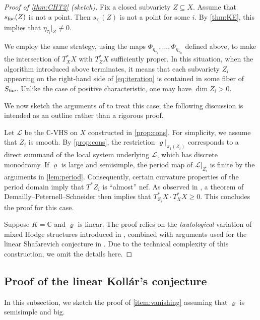 \documentclass[english]{amsproc}
\theoremstyle{plain}
\theoremstyle{definition}
\theoremstyle{remark}
\theoremstyle{plain}
\numberwithin{equation}{thm} %
\begin{document}
\begin{proof}[Proof of \cref{thm:CHT2} (sketch)]
		 
	Fix a closed subvariety $Z \subseteq X$. Assume that $s_{\rm fac}(Z)$ is not a point. Then $s_{\tau_i}(Z)$ is not a point for some $i$. By \cref{thm:KE}, this implies that $\eta_{\tau_i}|_{Z} \not\equiv 0$.
	
	We employ the same strategy, using the maps $\Phi_{\eta_{\tau_1}}, \ldots, \Phi_{\eta_{\tau_m}}$ defined above, to make the intersection of $T_X^*X$ with $T_Z^*X$ sufficiently proper. 
	In this situation, when the algorithm introduced above terminates, it means that each subvariety $Z_i$ appearing on the right-hand side of \eqref{eq:iteration} is contained in some fiber of $S_{\rm fac}$. 
	Unlike the case of positive characteristic, one may have $\dim Z_i > 0$.
	
	We now sketch the arguments of \cite{DW24} to treat this case; the following discussion is intended as an outline rather than a rigorous proof.
	
		
	Let $\mathcal{L}$ be the $\mathbb{C}$-VHS on $X$ constructed in \cref{prop:cons}. For simplicity, we assume that $Z_i$ is smooth. By \cref{prop:cons}, the restriction $\varrho|_{\pi_1(Z_i)}$ corresponds to a direct summand of the local system underlying $\mathcal{L}$, which has discrete monodromy. If $\varrho$ is large and semisimple, the period map of $\mathcal{L}|_{Z_i}$ is finite by the arguments in \cref{lem:period}. Consequently, certain curvature properties of the period domain imply that $T^*{Z_i}$ is ``almost'' nef. As observed in \cite{AW25}, a theorem of Demailly--Peternell--Schneider \cite{DPS94} then implies that $T_{Z_i}^*X \cdot T_X^*X \geq 0$. This concludes the proof for this case.
		
		\medspace
		
		  Suppose $K=\mathbb{C}$ and $\varrho$ is linear. The proof relies on the \emph{tautological} variation of mixed Hodge structures introduced in \cite{ES11}, combined with arguments used for the linear Shafarevich conjecture in \cite{EKPR12}. Due to the technical complexity of this construction, we omit the details here.
	\end{proof}	 
	\subsection{Proof of the linear Koll\'ar's conjecture}
	In this subsection, we sketch the proof of \cref{item:vanishing}  assuming that $\varrho$ is semisimple and big.
	
\end{document}
